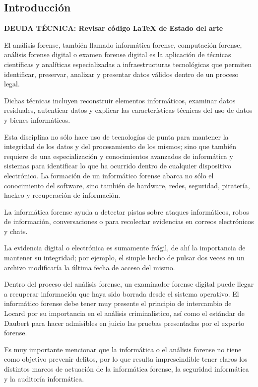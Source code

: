 \subsection{Introducción}

{\color{red}\textbf{DEUDA TÉCNICA: Revisar código LaTeX de Estado del arte}}

El análisis forense, también llamado informática forense, computación forense, análisis forense digital o examen forense digital es la aplicación de técnicas científicas y analíticas especializadas a infraestructuras tecnológicas que permiten identificar, preservar, analizar y presentar datos válidos dentro de un proceso legal.

Dichas técnicas incluyen reconstruir elementos informáticos, examinar datos residuales, autenticar datos y explicar las características técnicas del uso de datos y bienes informáticos.

Esta disciplina no sólo hace uso de tecnologías de punta para mantener la integridad de los datos y del procesamiento de los mismos; sino que también requiere de una especialización y conocimientos avanzados de informática y sistemas para identificar lo que ha ocurrido dentro de cualquier dispositivo electrónico. La formación de un informático forense abarca no sólo el conocimiento del software, sino también de hardware, redes, seguridad, piratería, hackeo y recuperación de información.

La informática forense ayuda a detectar pistas sobre ataques informáticos, robos de información, conversaciones o para recolectar evidencias en correos electrónicos y chats.

La evidencia digital o electrónica es sumamente frágil, de ahí la importancia de mantener su integridad; por ejemplo, el simple hecho de pulsar dos veces en un archivo modificaría la última fecha de acceso del mismo.

Dentro del proceso del análisis forense, un examinador forense digital puede llegar a recuperar información que haya sido borrada desde el sistema operativo. El informático forense debe tener muy presente el principio de intercambio de Locard por su importancia en el análisis criminalístico, así como el estándar de Daubert para hacer admisibles en juicio las pruebas presentadas por el experto forense.

Es muy importante mencionar que la informática o el análisis forense no tiene como objetivo prevenir delitos, por lo que resulta imprescindible tener claros los distintos marcos de actuación de la informática forense, la seguridad informática y la auditoría informática.

